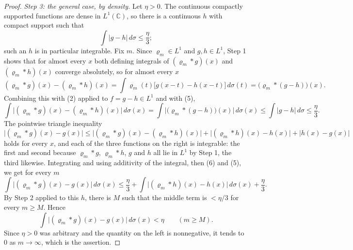 \begin{proof}
\emph{Step 3: the general case, by density.}  Let $\eta>0$.  The continuous
compactly supported functions are dense in $L^{1}(\mathbb{C})$, so there is a
continuous $h$ with compact support such that
\begin{equation}\tag{5}
  \int|g-h|\,d\sigma\le\frac{\eta}{3};
\end{equation}
such an $h$ is in particular integrable.  Fix $m$.  Since
$\varrho_m\in L^{1}$ and $g,h\in L^{1}$, Step 1 shows that for almost every
$x$ both defining integrals of $(\varrho_m*g)(x)$ and $(\varrho_m*h)(x)$
converge absolutely, so for almost every $x$
\[
  (\varrho_m*g)(x)-(\varrho_m*h)(x)
  =\int\varrho_m(t)\bigl[g(x-t)-h(x-t)\bigr]\,d\sigma(t)
  =\bigl(\varrho_m*(g-h)\bigr)(x).
\]
Combining this with (2) applied to $f=g-h\in L^{1}$ and with (5),
\begin{equation}\tag{6}
  \int\bigl|(\varrho_m*g)(x)-(\varrho_m*h)(x)\bigr|\,d\sigma(x)
  =\int\bigl|\bigl(\varrho_m*(g-h)\bigr)(x)\bigr|\,d\sigma(x)
  \le\int|g-h|\,d\sigma\le\frac{\eta}{3}.
\end{equation}
The pointwise triangle inequality
\[
  \bigl|(\varrho_m*g)(x)-g(x)\bigr|
  \le\bigl|(\varrho_m*g)(x)-(\varrho_m*h)(x)\bigr|
    +\bigl|(\varrho_m*h)(x)-h(x)\bigr|
    +\bigl|h(x)-g(x)\bigr|
\]
holds for every $x$, and each of the three functions on the right is
integrable: the first and second because $\varrho_m*g$, $\varrho_m*h$, $g$
and $h$ all lie in $L^{1}$ by Step 1, the third likewise.  Integrating and
using additivity of the integral, then (6) and (5), we get for every $m$
\begin{equation}\tag{7}
  \int\bigl|(\varrho_m*g)(x)-g(x)\bigr|\,d\sigma(x)
  \le\frac{\eta}{3}
    +\int\bigl|(\varrho_m*h)(x)-h(x)\bigr|\,d\sigma(x)
    +\frac{\eta}{3}.
\end{equation}
By Step 2 applied to this $h$, there is $M$ such that the middle term is
$<\eta/3$ for every $m\ge M$.  Hence
\[
  \int\bigl|(\varrho_m*g)(x)-g(x)\bigr|\,d\sigma(x)<\eta
  \qquad(m\ge M).
\]
Since $\eta>0$ was arbitrary and the quantity on the left is nonnegative, it
tends to $0$ as $m\to\infty$, which is the assertion.
\end{proof}
